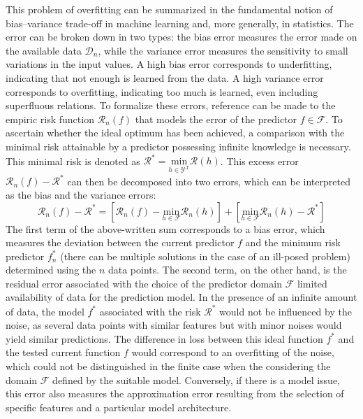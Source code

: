 \documentclass[main]{subfiles}
\begin{document}
This problem of overfitting can be summarized in the fundamental notion of bias--variance trade-off in machine learning and, more generally, in statistics. The error can be broken down in two types: the bias error measures the error made on the available data $\mathcal{D}_n$, while the variance error measures the sensitivity to small variations in the input values. A high bias error corresponds to underfitting, indicating that not enough is learned from the data. A high variance error corresponds to overfitting, indicating too much is learned, even including superfluous relations. To formalize these errors, reference can be made to the empiric risk function $\mathcal{R}_n(f)$ that models the error of the predictor $f\in\mathcal{F}$. To ascertain whether the ideal optimum has been achieved, a comparison with the minimal risk attainable by a predictor possessing infinite knowledge is necessary. This minimal risk is denoted as $\mathcal{R}^* = \underset{\scriptscriptstyle h\in\mathcal{Y}^{\mathcal{X}}} {\text{min}}\mathcal{R}(h)$. This excess error $\mathcal{R}_n(f)-\mathcal{R}^*$ can then be decomposed into two errors, which can be interpreted as the bias and the variance errors:
\begin{equation}\label{eq:generalization_error}
  \mathcal{R}_n(f)-\mathcal{R}^* = \left[\mathcal{R}_n(f) - \underset{\scriptstyle h\in\mathcal{F}} {\text{min}}\mathcal{R}_n(h)\right] + \left[\underset{\scriptstyle h\in\mathcal{F}} {\text{min}}\mathcal{R}_n(h) -\mathcal{R}^*\right]
\end{equation}
The first term of the above-written sum corresponds to a bias error, which measures the deviation between the current predictor $f$ and the minimum risk predictor $f_n^*$ (there can be multiple solutions in the case of an ill-posed problem) determined using the $n$ data points. The second term, on the other hand, is the residual error associated with the choice of the predictor domain $\mathcal{F}$  limited availability of data for the prediction model. In the presence of an infinite amount of data, the model $f^*$ associated with the risk $\mathcal{R}^*$ would not be influenced by the noise, as several data points with similar features but with minor noises would yield similar predictions. The difference in loss between this ideal function $f^*$ and the tested current function $f$ would correspond to an overfitting of the noise, which could not be distinguished in the finite case when the considering the domain $\mathcal{F}$ defined by the suitable model. Conversely, if there is a model issue, this error also measures the approximation error resulting from the selection of specific features and a particular model architecture.
\end{document}
